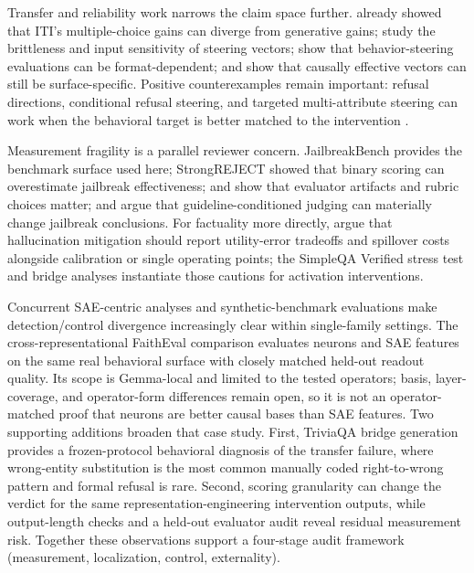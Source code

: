 \documentclass{article}
\begin{document}
Transfer and reliability work narrows the claim space further. \citet{li2023iti} already showed that ITI's multiple-choice gains can diverge from generative gains; \citet{tan2024steering} study the brittleness and input sensitivity of steering vectors; \citet{pres2024reliable} show that behavior-steering evaluations can be format-dependent; and \citet{opielka2026causality} show that causally effective vectors can still be surface-specific. Positive counterexamples remain important: refusal directions, conditional refusal steering, and targeted multi-attribute steering can work when the behavioral target is better matched to the intervention \citep{arditi2024refusal,lee2025cast,nguyen2025matsteer}.

Measurement fragility is a parallel reviewer concern. JailbreakBench \citep{chao2024jailbreakbench} provides the benchmark surface used here; StrongREJECT \citep{souly2024strongreject} showed that binary scoring can overestimate jailbreak effectiveness; \citet{chen2025safer} and \citet{eiras2025judge} show that evaluator artifacts and rubric choices matter; and \citet{huang2025guidedbench} argue that guideline-conditioned judging can materially change jailbreak conclusions.
For factuality more directly, \citet{yona2026metacognition} argue that hallucination mitigation should report utility-error tradeoffs and spillover costs alongside calibration or single operating points; the SimpleQA Verified stress test and bridge analyses instantiate those cautions for activation interventions.

Concurrent SAE-centric analyses \citep{arad2025saes,wang2026interpretability} and synthetic-benchmark evaluations \citep{wu2025axbench} make detection/control divergence increasingly clear within single-family settings.
The cross-representational FaithEval comparison evaluates neurons and SAE features on the same real behavioral surface with closely matched held-out readout quality.
Its scope is Gemma-local and limited to the tested operators; basis, layer-coverage, and operator-form differences remain open, so it is not an operator-matched proof that neurons are better causal bases than SAE features.
Two supporting additions broaden that case study.
First, TriviaQA bridge generation provides a frozen-protocol behavioral diagnosis of the transfer failure, where wrong-entity substitution is the most common manually coded right-to-wrong pattern and formal refusal is rare.
Second, scoring granularity can change the verdict for the same representation-engineering intervention outputs, while output-length checks and a held-out evaluator audit reveal residual measurement risk.
Together these observations support a four-stage audit framework (measurement, localization, control, externality).
\end{document}
